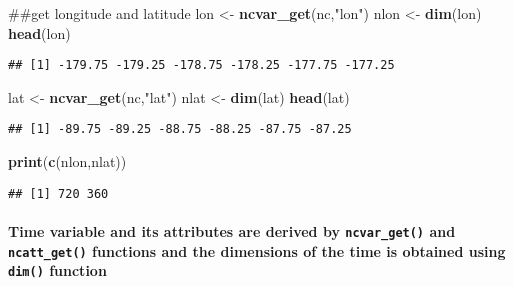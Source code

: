 \documentclass[]{article}
\newenvironment{Shaded}{\begin{snugshade}}{\end{snugshade}}
\newcommand{\KeywordTok}[1]{\textcolor[rgb]{0.13,0.29,0.53}{\textbf{#1}}}
\newcommand{\StringTok}[1]{\textcolor[rgb]{0.31,0.60,0.02}{#1}}
\newcommand{\NormalTok}[1]{#1}
\let\oldparagraph\paragraph
\renewcommand{\paragraph}[1]{\oldparagraph{#1}\mbox{}}
\begin{document}
\begin{Shaded}
\begin{Highlighting}[]
\NormalTok{##get longitude and latitude}
\NormalTok{lon <-}\StringTok{ }\KeywordTok{ncvar_get}\NormalTok{(nc,}\StringTok{"lon"}\NormalTok{)}
\NormalTok{nlon <-}\StringTok{ }\KeywordTok{dim}\NormalTok{(lon)}
\KeywordTok{head}\NormalTok{(lon)}
\end{Highlighting}
\end{Shaded}

\begin{verbatim}
## [1] -179.75 -179.25 -178.75 -178.25 -177.75 -177.25
\end{verbatim}

\begin{Shaded}
\begin{Highlighting}[]
\NormalTok{lat <-}\StringTok{ }\KeywordTok{ncvar_get}\NormalTok{(nc,}\StringTok{"lat"}\NormalTok{)}
\NormalTok{nlat <-}\StringTok{ }\KeywordTok{dim}\NormalTok{(lat)}
\KeywordTok{head}\NormalTok{(lat)}
\end{Highlighting}
\end{Shaded}

\begin{verbatim}
## [1] -89.75 -89.25 -88.75 -88.25 -87.75 -87.25
\end{verbatim}

\begin{Shaded}
\begin{Highlighting}[]
\KeywordTok{print}\NormalTok{(}\KeywordTok{c}\NormalTok{(nlon,nlat))}
\end{Highlighting}
\end{Shaded}

\begin{verbatim}
## [1] 720 360
\end{verbatim}

\paragraph{\texorpdfstring{Time variable and its attributes are derived
by \texttt{ncvar\_get()} and \texttt{ncatt\_get()} functions and the
dimensions of the time is obtained using \texttt{dim()}
function}{Time variable and its attributes are derived by ncvar\_get() and ncatt\_get() functions and the dimensions of the time is obtained using dim() function}}\label{time-variable-and-its-attributes-are-derived-by-ncvar_get-and-ncatt_get-functions-and-the-dimensions-of-the-time-is-obtained-using-dim-function}
\end{document}
